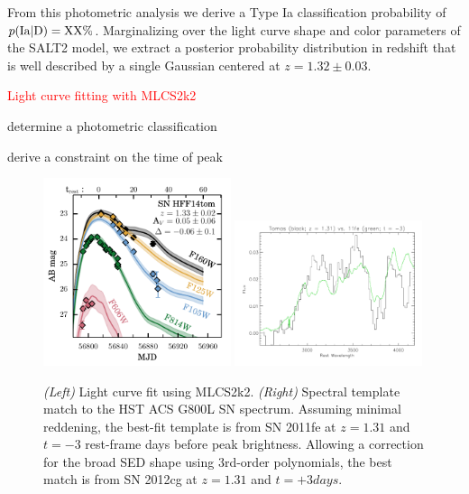 From this photometric analysis we derive a Type Ia classification
probability of $p(\rm Ia|{\bf \rm D})=XX\%$.  Marginalizing over the
light curve shape and color parameters of the SALT2 model, we extract
a posterior probability distribution in redshift that is well
described by a single Gaussian centered at $z=1.32\pm0.03$.




\textcolor{red}{Light curve fitting with MLCS2k2}

determine a photometric classification 

derive a constraint on the time of peak 




\begin{figure}
\begin{center}
\includegraphics[width=0.49\textwidth]{FIG/lcfit_mlcs2k2_ABmag}
\includegraphics[width=0.49\textwidth]{FIG/specfit_11fe_t-3_z131}
\caption{ {\it (Left)} Light curve fit using MLCS2k2. 
{\it (Right)} Spectral template match to the HST ACS G800L SN
spectrum.  Assuming minimal reddening, the best-fit template is from
SN 2011fe at $z=1.31$ and $t=-3$ rest-frame days before peak
brightness.  Allowing a correction for the broad SED shape using
3rd-order polynomials, the best match is from SN 2012cg at $z=1.31$
and $t=+3 days$.
\label{fig:mlcsfit} }
\end{center}
\end{figure}

